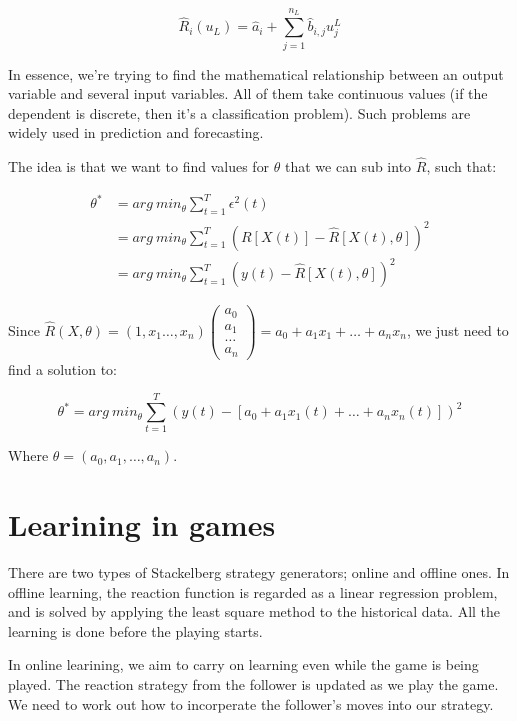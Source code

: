 \[
  \hat{R}_i(u_L) = \hat{a}_i + \sum^{n_L}_{j=1}\hat{b}_{i,j}u^L_{j}
\]

In essence, we're trying to find the mathematical relationship between an output
variable and several input variables. All of them take continuous values (if the
dependent is discrete, then it's a classification problem). Such problems are
widely used in prediction and forecasting.

The idea is that we want to find values for $\theta$ that we can sub into
$\hat{R}$, such that:

\[
  \begin{split}
  \theta^* &= arg~min_\theta \sum^T_{t=1}\epsilon^2(t)\\
           &= arg~min_\theta \sum^T_{t=1}(R[X(t)] - \hat{R}[X(t), \theta])^2\\
           &= arg~min_\theta \sum^T_{t=1}(y(t) - \hat{R}[X(t), \theta])^2
  \end{split}
\]

Since $\hat{R}(X, \theta) = (1, x_1 \dots, x_n) \left( \begin{smallmatrix}
a_0\\ a_1\\ \dots \\ a_n \end{smallmatrix} \right) = a_0 + a_1x_1 + \dots +
a_nx_n$, we just need to find a solution to:

\[
  \theta^* = arg~min_\theta \sum^T_{t=1}(y(t) - [a_0 + a_1x_1(t) + \dots +
a_nx_n(t)])^2
\]

Where $\theta = (a_0, a_1, \dots, a_n)$.



\section{Learining in games}

There are two types of Stackelberg strategy generators; online and offline ones.
In offline learning, the reaction function is regarded as a linear regression
problem, and is solved by applying the least square method to the historical
data. All the learning is done before the playing starts.

In online learining, we aim to carry on learning even while the game is being
played. The reaction strategy from the follower is updated as we play the game.
We need to work out how to incorperate the follower's moves into our strategy.

